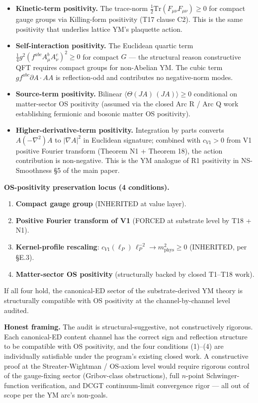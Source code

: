 \documentclass[
  11pt,a4paper]{article}
\providecommand{\tightlist}{%
  \setlength{\itemsep}{0pt}\setlength{\parskip}{0pt}}
\begin{document}
\begin{itemize}
\tightlist
\item
  \textbf{Kinetic-term positivity.} The trace-norm
  \(\tfrac{1}{2}\mathrm{Tr}(F_{\mu\nu}F_{\mu\nu}) \ge 0\) for compact
  gauge groups via Killing-form positivity (T17 clause C2). This is the
  same positivity that underlies lattice YM's plaquette action.
\item
  \textbf{Self-interaction positivity.} The Euclidean quartic term
  \(\tfrac{1}{4}g^2(f^{abc}A_\mu^b A_\nu^c)^2 \ge 0\) for compact \(G\)
  --- the structural reason constructive QFT requires compact groups for
  non-Abelian YM. The cubic term \(gf^{abc}\partial A\cdot AA\) is
  reflection-odd and contributes no negative-norm modes.
\item
  \textbf{Source-term positivity.} Bilinear
  \(\langle\Theta(JA)\,(JA)\rangle \ge 0\) conditional on matter-sector
  OS positivity (assumed via the closed Arc R / Arc Q work establishing
  fermionic and bosonic matter OS positivity).
\item
  \textbf{Higher-derivative-term positivity.} Integration by parts
  converts \(A(-\nabla^2)A\) to \(|\nabla A|^2\) in Euclidean signature;
  combined with \(c_{V1} > 0\) from V1 positive Fourier transform
  (Theorem N1 + Theorem 18), the action contribution is non-negative.
  This is the YM analogue of R1 positivity in NS-Smoothness §5 of the
  main paper.
\end{itemize}

\textbf{OS-positivity preservation locus (4 conditions).}

\begin{enumerate}
\def\labelenumi{\arabic{enumi}.}
\tightlist
\item
  \textbf{Compact gauge group} (INHERITED at value layer).
\item
  \textbf{Positive Fourier transform of V1} (FORCED at substrate level
  by T18 + N1).
\item
  \textbf{Kernel-profile rescaling}:
  \(c_{V1}(\ell_P)\,\ell_P^{-2} \to m_\mathrm{phys}^2 \ge 0\)
  (INHERITED, per §E.3).
\item
  \textbf{Matter-sector OS positivity} (structurally backed by closed
  T1--T18 work).
\end{enumerate}

If all four hold, the canonical-ED sector of the substrate-derived YM
theory is structurally compatible with OS positivity at the
channel-by-channel level audited.

\textbf{Honest framing.} The audit is structural-suggestive, not
constructively rigorous. Each canonical-ED content channel has the
correct sign and reflection structure to be compatible with OS
positivity, and the four conditions (1)--(4) are individually
satisfiable under the program's existing closed work. A constructive
proof at the Streater-Wightman / OS-axiom level would require rigorous
control of the gauge-fixing sector (Gribov-class obstructions), full
\(n\)-point Schwinger-function verification, and DCGT continuum-limit
convergence rigor --- all out of scope per the YM arc's non-goals.
\end{document}

